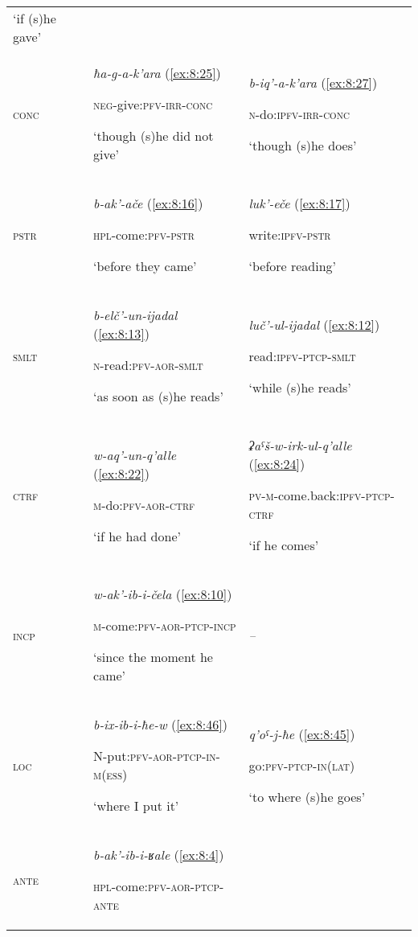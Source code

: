 ﻿\documentclass[output=paper]{langsci/langscibook}
\begin{document}
\begin{table}[b]
\begin{tabular}{@{}lp{}<{\raggedright}p{}<{\raggedright}@{}}
`if (s)he gave'\tabularnewline
\textsc{conc} & \emph{ħa-g-a-k'ara} (\ref{ex:8:25})

\textsc{neg}-give:\textsc{pfv}-\textsc{irr}-\textsc{conc}

`though (s)he did not give' & \emph{b-iq'-a-k'ara} (\ref{ex:8:27})

\textsc{n}-do:\textsc{ipfv}-\textsc{irr}-\textsc{conc}

`though (s)he does'\tabularnewline
\textsc{pstr} & \emph{b-ak'-ače} (\ref{ex:8:16})

\textsc{hpl}-come:\textsc{pfv}-\textsc{pstr}

`before they came' & \emph{luk'-eče} (\ref{ex:8:17})

write:\textsc{ipfv}-\textsc{pstr}

`before reading'\tabularnewline
\textsc{smlt} & \emph{b-elč'-un-ijadal} (\ref{ex:8:13})

\textsc{n}-read:\textsc{pfv}-\textsc{aor}-\textsc{smlt}

`as soon as (s)he reads' & \emph{luč'-ul-ijadal} (\ref{ex:8:12})

read:\textsc{ipfv}-\textsc{ptcp}-\textsc{smlt}

`while (s)he reads'\tabularnewline
\textsc{ctrf} & \emph{w-aq'-un-q'alle} (\ref{ex:8:22})

\textsc{m}-do:\textsc{pfv}-\textsc{aor}-\textsc{ctrf}

`if he had done' & \emph{ʡaˤš-w-irk-ul-q'alle} (\ref{ex:8:24})

\textsc{pv}-\textsc{m}-come.back:\textsc{ipfv}-\textsc{ptcp}-\textsc{ctrf}

`if he comes'\tabularnewline
\textsc{incp} & \emph{w-ak'-ib-i-čela} (\ref{ex:8:10})

\textsc{m}-come:\textsc{pfv}-\textsc{aor}-\textsc{ptcp}-\textsc{incp}

`since the moment he came' & \emph{--}\tabularnewline
\textsc{loc} & \emph{b-ix-ib-i-ħe-w} (\ref{ex:8:46})

\textsc{N}-put:\textsc{pfv}-\textsc{aor}-\textsc{ptcp}-\textsc{in}-\textsc{m}(\textsc{ess})

`where I put it' & \emph{q'oˤ-j-ħe} (\ref{ex:8:45})

go:\textsc{pfv}-\textsc{ptcp}-\textsc{in}(\textsc{lat})

`to where (s)he goes'\tabularnewline
\textsc{ante} & \emph{b-ak'-ib-i-ʁale} (\ref{ex:8:4})

\textsc{hpl}-come:\textsc{pfv}-\textsc{aor}-\textsc{ptcp}-\textsc{ante}


\end{tabular}
\end{table}
\end{document}
